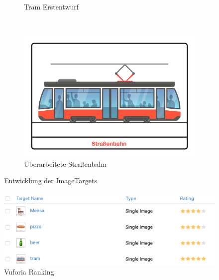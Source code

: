 \begin{figure}[H]
\begin{subfigure}[b]{0.2\textwidth}
        \caption{Tram Erstentwurf}
        \label{fig:oldTram}
    \end{subfigure}
    ~
    \begin{subfigure}[b]{0.2\textwidth}
        \includegraphics[width=\textwidth]{assets/tram_new.jpg}
        \caption{Überarbeitete Straßenbahn}
        \label{fig:newTram}
    \end{subfigure}
    \caption{Entwicklung der ImageTargets}\label{fig:impl_imageTargets}
\end{figure}

\begin{figure}[h]
        \includegraphics[width=\textwidth]{assets/vuforiaImageRanking}
        \caption{Vuforia Ranking}
        \label{fig:impl_vuforiaRanking}
\end{figure}

